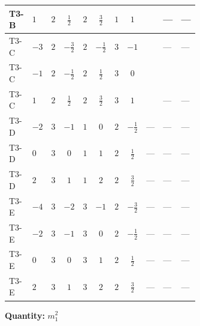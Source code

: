 \documentclass[8pt]{article}
\begin{document}
\begin{landscape}
\begin{longtable}{@{}llcccccc >{\raggedright\arraybackslash}p{0.21\linewidth} >{\raggedright\arraybackslash}p{0.21\linewidth} >{\raggedright\arraybackslash}p{0.21\linewidth}@{}}
\midrule
T3-B & $1$ & $2$ & $\frac{1}{2}$ & $2$ & $\frac{3}{2}$ & $1$ & $1$ & \scriptsize\adjustbox{max width=\linewidth}{$\begin{gathered} -\frac{3 {g_1}^2 {m_1^2}}{2}\end{gathered}$} & --- & --- \\
\midrule
T3-C & $-3$ & $2$ & $-\frac{3}{2}$ & $2$ & $-\frac{1}{2}$ & $3$ & $-1$ & \scriptsize\adjustbox{max width=\linewidth}{$\begin{gathered} -\frac{27 {g_1}^2 {m_1^2}}{2}\end{gathered}$} & --- & --- \\
\midrule
T3-C & $-1$ & $2$ & $-\frac{1}{2}$ & $2$ & $\frac{1}{2}$ & $3$ & $0$ & \scriptsize\adjustbox{max width=\linewidth}{$\begin{gathered} -\frac{3 {g_1}^2 {m_1^2}}{2}\end{gathered}$} & \scriptsize\adjustbox{max width=\linewidth}{$\begin{gathered} -12 \operatorname{Tr}\!\left({M_F}\,\left({M_F}\right)^{*}\,\left({y_1}\right)^{T}\,\left({y_1}\right)^{*}\right)\end{gathered}$} & \scriptsize\adjustbox{max width=\linewidth}{$\begin{gathered} -12 \operatorname{Tr}\!\left({M_F}\,\left({y_1}\right)^{\dagger}\,{y_1}\,\left({M_F}\right)^{*}\right)\end{gathered}$} \\
\midrule
T3-C & $1$ & $2$ & $\frac{1}{2}$ & $2$ & $\frac{3}{2}$ & $3$ & $1$ & \scriptsize\adjustbox{max width=\linewidth}{$\begin{gathered} -\frac{3 {g_1}^2 {m_1^2}}{2}\end{gathered}$} & --- & --- \\
\midrule
T3-D & $-2$ & $3$ & $-1$ & $1$ & $0$ & $2$ & $-\frac{1}{2}$ & --- & --- & --- \\
\midrule
T3-D & $0$ & $3$ & $0$ & $1$ & $1$ & $2$ & $\frac{1}{2}$ & --- & --- & --- \\
\midrule
T3-D & $2$ & $3$ & $1$ & $1$ & $2$ & $2$ & $\frac{3}{2}$ & --- & --- & --- \\
\midrule
T3-E & $-4$ & $3$ & $-2$ & $3$ & $-1$ & $2$ & $-\frac{3}{2}$ & --- & --- & --- \\
\midrule
T3-E & $-2$ & $3$ & $-1$ & $3$ & $0$ & $2$ & $-\frac{1}{2}$ & --- & --- & --- \\
\midrule
T3-E & $0$ & $3$ & $0$ & $3$ & $1$ & $2$ & $\frac{1}{2}$ & --- & --- & --- \\
\midrule
T3-E & $2$ & $3$ & $1$ & $3$ & $2$ & $2$ & $\frac{3}{2}$ & --- & --- & --- \\
\midrule
\bottomrule
\end{longtable}
\clearpage
\noindent\textbf{Quantity: }$m_1^2$\par\smallskip

\end{landscape}
\end{document}

